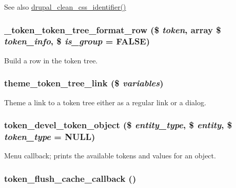 \begin{DoxySeeAlso}{See also}
\hyperlink{common_8inc_a71bc20ece521646a633b65868a441d26}{drupal\_\-clean\_\-css\_\-identifier()} 
\end{DoxySeeAlso}
\hypertarget{token_8pages_8inc_ad7895827dd47b9617320c5a9de747ee7}{
\subsubsection[{\_\-token\_\-token\_\-tree\_\-format\_\-row}]{\setlength{\rightskip}{0pt plus 5cm}\_\-token\_\-token\_\-tree\_\-format\_\-row (\$ {\em token}, \/  array \$ {\em token\_\-info}, \/  \$ {\em is\_\-group} = {\ttfamily FALSE})}}
\label{token_8pages_8inc_ad7895827dd47b9617320c5a9de747ee7}
Build a row in the token tree. \hypertarget{token_8pages_8inc_a111e8ee04e4553f7c6bd04732a175435}{
\subsubsection[{theme\_\-token\_\-tree\_\-link}]{\setlength{\rightskip}{0pt plus 5cm}theme\_\-token\_\-tree\_\-link (\$ {\em variables})}}
\label{token_8pages_8inc_a111e8ee04e4553f7c6bd04732a175435}
Theme a link to a token tree either as a regular link or a dialog. \hypertarget{token_8pages_8inc_a2bdee1bca10e805d74679a6e50c6c7d8}{
\subsubsection[{token\_\-devel\_\-token\_\-object}]{\setlength{\rightskip}{0pt plus 5cm}token\_\-devel\_\-token\_\-object (\$ {\em entity\_\-type}, \/  \$ {\em entity}, \/  \$ {\em token\_\-type} = {\ttfamily NULL})}}
\label{token_8pages_8inc_a2bdee1bca10e805d74679a6e50c6c7d8}
Menu callback; prints the available tokens and values for an object. \hypertarget{token_8pages_8inc_ad77cea030ce3c4aa50e43d5b93d91908}{
\subsubsection[{token\_\-flush\_\-cache\_\-callback}]{\setlength{\rightskip}{0pt plus 5cm}token\_\-flush\_\-cache\_\-callback ()}}
